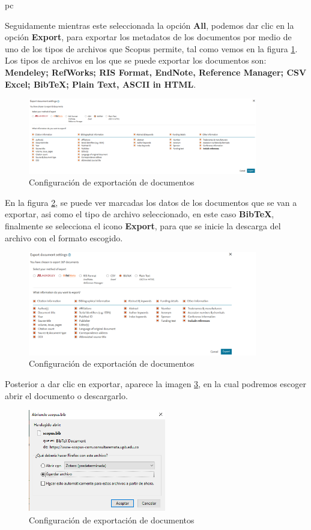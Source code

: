 pc\documentclass[a4paper,12pt,openany]{book}
\begin{document}
\begin{itemize}
Seguidamente mientras este seleccionada la opción \textbf{All}, podemos dar clic en la opción \textbf{Export}, para exportar los metadatos de los documentos por medio de uno de los tipos de archivos que Scopus permite, tal como vemos en la figura \ref{fig:scop19}. Los tipos de archivos en los que se puede exportar los documentos son: \textbf{Mendeley; RefWorks; RIS Format, EndNote, Reference Manager; CSV Excel; BibTeX; Plain Text, ASCII in HTML}. 


     \begin{figure}[H]
        \centering
    	\includegraphics[width=10cm]{Scop19.png}
        \caption{Configuración de exportación de documentos}
        \label{fig:scop19}
        \end{figure}

En la figura \ref{fig:scop20}, se puede ver marcadas los datos de los documentos que se van a exportar, asi como el tipo de archivo seleccionado, en este caso \textbf{BibTeX}, finalmente se selecciona el icono \textbf{Export}, para que se inicie la descarga del archivo con el formato escogido.

     \begin{figure}[H]
        \centering
    	\includegraphics[width=10cm]{Scop20.png}
        \caption{Configuración de exportación de documentos}
        \label{fig:scop20}
        \end{figure}

Posterior a dar clic en exportar, aparece la imagen \ref{fig:scop21}, en la cual podremos escoger abrir el documento o descargarlo.

     \begin{figure}[H]
        \centering
    	\includegraphics[width=6cm]{Scop21.png}
        \caption{Configuración de exportación de documentos}
        \label{fig:scop21}
        \end{figure}


\end{itemize}
\end{document}
